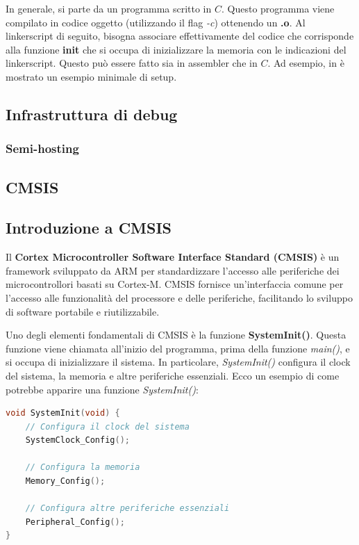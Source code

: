\documentclass{article}
\begin{document}


In generale, si parte da un programma scritto in $C$. Questo programma viene compilato in codice oggetto (utilizzando il flag \textit{-c}) ottenendo un \textbf{.o}. Al linkerscript di seguito, bisogna associare effettivamente del codice che corrisponde alla funzione \textbf{init} che si occupa di inizializzare la memoria con le indicazioni del linkerscript. Questo può essere fatto sia in assembler che in $C$. Ad esempio, in è mostrato un esempio minimale di setup. 



\subsection{Infrastruttura di debug}
\subsubsection{Semi-hosting}
\subsection{CMSIS}
\subsection{Introduzione a CMSIS}
Il \textbf{Cortex Microcontroller Software Interface Standard (CMSIS)} è un framework sviluppato da ARM per standardizzare l'accesso alle periferiche dei microcontrollori basati su Cortex-M. CMSIS fornisce un'interfaccia comune per l'accesso alle funzionalità del processore e delle periferiche, facilitando lo sviluppo di software portabile e riutilizzabile.

Uno degli elementi fondamentali di CMSIS è la funzione \textbf{SystemInit()}. Questa funzione viene chiamata all'inizio del programma, prima della funzione \textit{main()}, e si occupa di inizializzare il sistema. In particolare, \textit{SystemInit()} configura il clock del sistema, la memoria e altre periferiche essenziali. Ecco un esempio di come potrebbe apparire una funzione \textit{SystemInit()}:

\begin{lstlisting}[language=C]
void SystemInit(void) {
    // Configura il clock del sistema
    SystemClock_Config();
    
    // Configura la memoria
    Memory_Config();
    
    // Configura altre periferiche essenziali
    Peripheral_Config();
}
\end{lstlisting}
\end{document}
